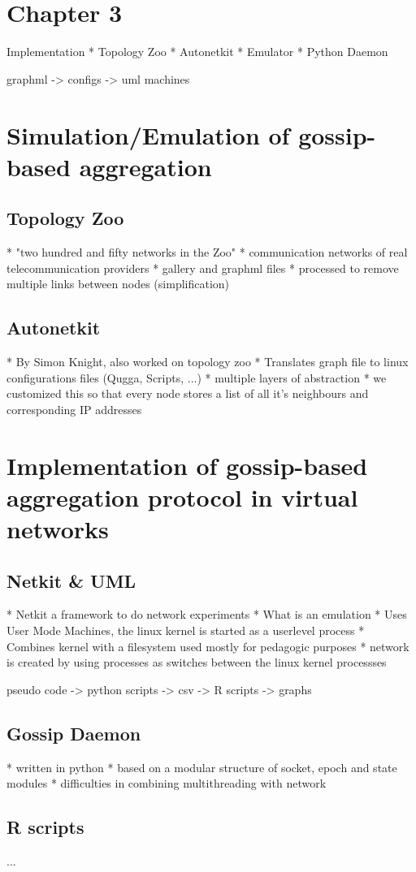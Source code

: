 \documentclass[11pt,a4paper]{article}
\begin{document}
\newpage

\section{Chapter 3}
Implementation
* Topology Zoo
* Autonetkit
* Emulator
* Python Daemon

graphml -> configs -> uml machines
\section{Simulation/Emulation of gossip-based aggregation}
\subsection{Topology Zoo}
* "two hundred and fifty networks in the Zoo"
* communication networks of real telecommunication providers
* gallery and graphml files
* processed to remove multiple links between nodes (simplification)

\subsection{Autonetkit}
* By Simon Knight, also worked on topology zoo
* Translates graph file to linux configurations files (Qugga, Scripts, ...)
* multiple layers of abstraction
* we customized this so that every node stores a list of all it's neighbours and corresponding IP addresses

\section{Implementation of gossip-based aggregation protocol in virtual networks}
\subsection{Netkit & UML}
* Netkit a framework to do network experiments
* What is an emulation
* Uses User Mode Machines, the linux kernel is started as a userlevel process
* Combines kernel with a filesystem used mostly for pedagogic purposes
* network is created by using processes as switches between the linux kernel processses

pseudo code -> python scripts -> csv -> R scripts -> graphs
\subsection{Gossip Daemon}
* written in python
* based on a modular structure of socket, epoch and state modules
* difficulties in combining multithreading with network

\subsection{R scripts}
...
\end{document}
